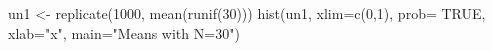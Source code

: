 \begin{Schunk}
\begin{Sinput}
  un1 <- replicate(1000, mean(runif(30)))
  hist(un1, xlim=c(0,1), prob= TRUE, xlab="x", main="Means with N=30")
\end{Sinput}
\end{Schunk}
